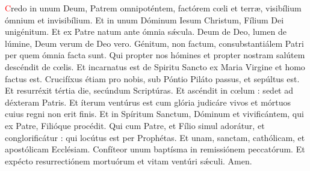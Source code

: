 \textcolor{red}{C}redo in unum Deum, Patrem omnipoténtem, factórem c{\oe}li et terr{\ae}, visibílium ómnium et invisibílium.
Et in unum Dóminum Iesum Christum, Fílium Dei unigénitum. Et ex Patre natum ante ómnia s{\'\ae}cula. Deum de Deo, lumen de lúmine, 
Deum verum de Deo vero. Génitum, non factum, consubstantiálem Patri per quem ómnia facta sunt. Qui propter nos hómines et propter 
nostram salútem descéndit de c{\oe}lis. Et incarnatus est de Spiritu Sancto ex Maria Virgine et homo factus est. Crucifíxus étiam pro nobis, 
sub Póntio Piláto passus, et sepúltus est. Et resurréxit tértia die, secúndum Scriptúras. Et ascéndit in c{\oe}lum : sedet ad déxteram Patris. 
Et íterum ventúrus est cum glória judicáre vivos et mórtuos cuius regni non erit finis. Et in Spíritum Sanctum, Dóminum et vivificántem, qui ex Patre, 
Filióque procédit. Qui cum Patre, et Fílio simul adorátur, et conglorificátur : qui locútus est per Prophétas. Et unam, sanctam, cathólicam, 
et apostólicam Ecclésiam. Confíteor unum baptísma in remissiónem peccatórum. Et expécto resurrectiónem mortuórum et vitam ventúri s{\'\ae}culi. Amen.